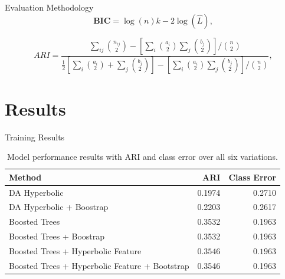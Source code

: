 \documentclass{beamer}
\begin{document}
\begin{frame}{Evaluation Methodology}
$$\textbf{BIC} = \log(n) k - 2 \log(\hat{L}), $$

$$ARI = \frac{ \sum_{ij} \binom{n_{ij}}{2} - [\sum_i \binom{a_i}{2} \sum_j \binom{b_j}{2}] / \binom{n}{2} }{ \frac{1}{2} [\sum_i \binom{a_i}{2} + \sum_j \binom{b_j}{2}] - [\sum_i \binom{a_i}{2} \sum_j \binom{b_j}{2}] / \binom{n}{2} }, $$
\end{frame}



\section{Results}

\begin{frame}{Training Results}
\begin{small}
\begin{table}[!h]
\centering
\caption{Model performance results with ARI and class error over all six variations. }
\vspace{5pt}
\label{modelPerf}
\begin{tabular}{|l|rr|}
\hline\hline
Method                                         & ARI    & Class Error \\
\hline
DA Hyperbolic                                  & 0.1974 & 0.2710      \\
DA Hyperbolic + Boostrap                       & 0.2203 & 0.2617      \\
Boosted Trees                                  & 0.3532 & 0.1963      \\
Boosted Trees + Boostrap                       & 0.3532 & 0.1963      \\
Boosted Trees + Hyperbolic Feature             & $\bm{0.3546}$ & $\bm{0.1963}  $   \\
Boosted Trees + Hyperbolic Feature + Bootstrap & 0.3546 & 0.1963     \\
\hline\hline
\end{tabular}
\end{table}
\end{small}
\end{frame}
\end{document}
